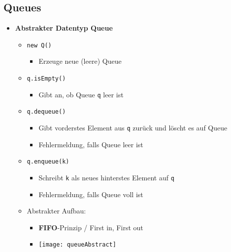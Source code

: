 \subsection{Queues}
    \begin{itemize}
        \item \textbf{Abstrakter Datentyp Queue}
            \begin{itemize}
                \item \texttt{new Q()}
                    \begin{itemize}
                        \item Erzeuge neue (leere) Queue
                    \end{itemize}
                
                \item \texttt{q.isEmpty()}
                    \begin{itemize}
                        \item Gibt an, ob Queue \texttt{q} leer ist 
                    \end{itemize}
                
                \item \texttt{q.dequeue()}
                    \begin{itemize}
                        \item Gibt vorderstes Element aus \texttt{q} zurück und löscht es auf Queue 
                        \item Fehlermeldung, falls Queue leer ist 
                    \end{itemize}
                
                \item \texttt{q.enqueue(k)} 
                    \begin{itemize}
                        \item Schreibt \texttt{k} als neues hinterstes Element auf \texttt{q}
                        \item Fehlermeldung, falls Queue voll ist 
                    \end{itemize}
                
                \item Abstrakter Aufbau:
                    \begin{itemize}
                        \item \textbf{FIFO}-Prinzip / First in, First out 
                        \item[] \texttt{[image: queueAbstract]}
                    \end{itemize}
            \end{itemize}


\end{itemize}

